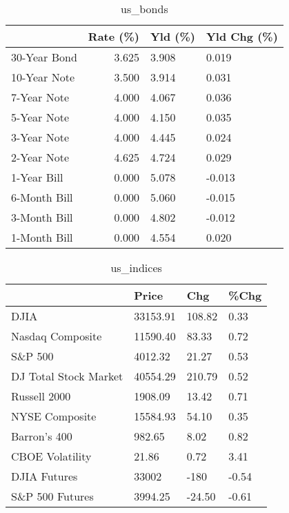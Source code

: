 \documentclass{article}%
\begin{document}
%


\begin{table}[htbp]%
\caption{us\_bonds}%
\centering%
\begin{adjustbox}{width=1\textwidth}%
\begin{tabular}{lrll}
\toprule
             &  Rate (\%) & Yld (\%) & Yld Chg (\%) \\
\midrule
30-Year Bond &     3.625 &   3.908 &       0.019 \\
10-Year Note &     3.500 &   3.914 &       0.031 \\
 7-Year Note &     4.000 &   4.067 &       0.036 \\
 5-Year Note &     4.000 &   4.150 &       0.035 \\
 3-Year Note &     4.000 &   4.445 &       0.024 \\
 2-Year Note &     4.625 &   4.724 &       0.029 \\
 1-Year Bill &     0.000 &   5.078 &      -0.013 \\
6-Month Bill &     0.000 &   5.060 &      -0.015 \\
3-Month Bill &     0.000 &   4.802 &      -0.012 \\
1-Month Bill &     0.000 &   4.554 &       0.020 \\
\bottomrule
\end{tabular}
%
\end{adjustbox}%
\end{table}

%


\begin{table}[htbp]%
\caption{us\_indices}%
\centering%
\begin{adjustbox}{width=1\textwidth}%
\begin{tabular}{llll}
\toprule
                      &    Price &    Chg &  \%Chg \\
\midrule
                 DJIA & 33153.91 & 108.82 &  0.33 \\
     Nasdaq Composite & 11590.40 &  83.33 &  0.72 \\
              S\&P 500 &  4012.32 &  21.27 &  0.53 \\
DJ Total Stock Market & 40554.29 & 210.79 &  0.52 \\
         Russell 2000 &  1908.09 &  13.42 &  0.71 \\
       NYSE Composite & 15584.93 &  54.10 &  0.35 \\
         Barron's 400 &   982.65 &   8.02 &  0.82 \\
      CBOE Volatility &    21.86 &   0.72 &  3.41 \\
         DJIA Futures &    33002 &   -180 & -0.54 \\
      S\&P 500 Futures &  3994.25 & -24.50 & -0.61 \\
\bottomrule
\end{tabular}
%
\end{adjustbox}%
\end{table}
\end{document}
